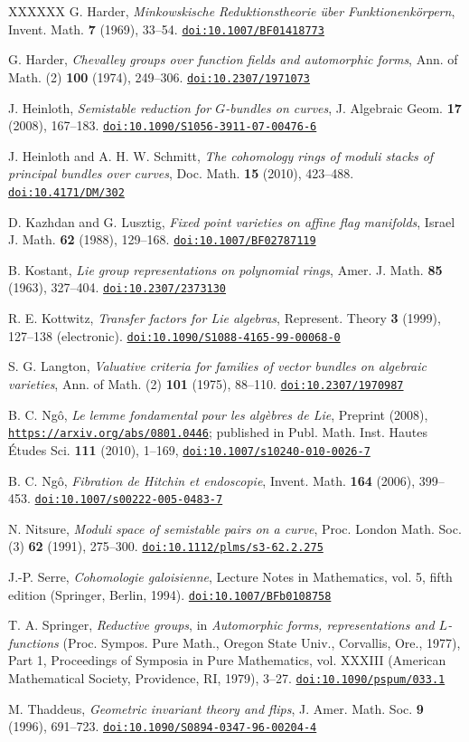 \documentclass[12pt,a4paper,oneside,english,leqno]{smfart}
\newcounter{theo}
\numberwithin{theo}{subsection}
\newcommand{\doi}[1]{\href{https://doi.org/#1}{\texttt{doi:#1}}}
\newcommand{\urlref}[1]{\href{#1}{\nolinkurl{#1}}}
\begin{document}
\begin{thebibliography}{XXXXXX}
 G. Harder, \emph{Minkowskische Reduktionstheorie \"uber Funktionenk\"orpern}, Invent. Math. \textbf{7} (1969), 33--54. \doi{10.1007/BF01418773}

 G. Harder, \emph{Chevalley groups over function fields and automorphic forms}, Ann. of Math. (2) \textbf{100} (1974), 249--306. \doi{10.2307/1971073}

 J. Heinloth, \emph{Semistable reduction for $G$-bundles on curves}, J. Algebraic Geom. \textbf{17} (2008), 167--183. \doi{10.1090/S1056-3911-07-00476-6}

 J. Heinloth and A. H. W. Schmitt, \emph{The cohomology rings of moduli stacks of principal bundles over curves}, Doc. Math. \textbf{15} (2010), 423--488. \doi{10.4171/DM/302}

 D. Kazhdan and G. Lusztig, \emph{Fixed point varieties on affine flag manifolds}, Israel J. Math. \textbf{62} (1988), 129--168. \doi{10.1007/BF02787119}

 B. Kostant, \emph{Lie group representations on polynomial rings}, Amer. J. Math. \textbf{85} (1963), 327--404. \doi{10.2307/2373130}

 R. E. Kottwitz, \emph{Transfer factors for Lie algebras}, Represent. Theory \textbf{3} (1999), 127--138 (electronic). \doi{10.1090/S1088-4165-99-00068-0}

 S. G. Langton, \emph{Valuative criteria for families of vector bundles on algebraic varieties}, Ann. of Math. (2) \textbf{101} (1975), 88--110. \doi{10.2307/1970987}

 B. C. Ng\^o, \emph{Le lemme fondamental pour les alg\`ebres de Lie}, Preprint (2008), \urlref{https://arxiv.org/abs/0801.0446}; published in Publ. Math. Inst. Hautes \'Etudes Sci. \textbf{111} (2010), 1--169, \doi{10.1007/s10240-010-0026-7}

 B. C. Ng\^o, \emph{Fibration de Hitchin et endoscopie}, Invent. Math. \textbf{164} (2006), 399--453. \doi{10.1007/s00222-005-0483-7}

 N. Nitsure, \emph{Moduli space of semistable pairs on a curve}, Proc. London Math. Soc. (3) \textbf{62} (1991), 275--300. \doi{10.1112/plms/s3-62.2.275}

 J.-P. Serre, \emph{Cohomologie galoisienne}, Lecture Notes in Mathematics, vol. 5, fifth edition (Springer, Berlin, 1994). \doi{10.1007/BFb0108758}

 T. A. Springer, \emph{Reductive groups}, in \emph{Automorphic forms, representations and $L$-functions} (Proc. Sympos. Pure Math., Oregon State Univ., Corvallis, Ore., 1977), Part 1, Proceedings of Symposia in Pure Mathematics, vol. XXXIII (American Mathematical Society, Providence, RI, 1979), 3--27. \doi{10.1090/pspum/033.1}

 M. Thaddeus, \emph{Geometric invariant theory and flips}, J. Amer. Math. Soc. \textbf{9} (1996), 691--723. \doi{10.1090/S0894-0347-96-00204-4}

\end{thebibliography}
\end{document}

